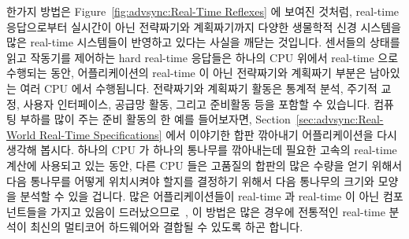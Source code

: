 한가지 방법은
Figure~\ref{fig:advsync:Real-Time Reflexes} 에 보여진 것처럼, real-time 응답으로부터
실시간이 아닌 전략짜기와 계획짜기까지 다양한 생물학적 신경 시스템을 많은
real-time 시스템들이 반영하고 있다는 사실을 깨닫는 것입니다.
센서들의 상태를 읽고 작동기를 제어하는 hard real-time 응답들은 하나의 CPU
위에서 real-time 으로 수행되는 동안, 어플리케이션의 real-time 이 아닌
전략짜기와 계획짜기 부분은 남아있는 여러 CPU 에서 수행됩니다.
전략짜기와 계획짜기 활동은 통계적 분석, 주기적 교정, 사용자 인터페이스, 공급망
활동, 그리고 준비활동 등을 포함할 수 있습니다.
컴퓨팅 부하를 많이 주는 준비 활동의 한 예를 들어보자면,
Section~\ref{sec:advsync:Real-World Real-Time Specifications} 에서 이야기한 합판
깎아내기 어플리케이션을 다시 생각해 봅시다.
하나의 CPU 가 하나의 통나무를 깎아내는데 필요한 고속의 real-time 계산에
사용되고 있는 동안, 다른 CPU 들은 고품질의 합판의 많은 수량을 얻기 위해서 다음
통나무를 어떻게 위치시켜야 할지를 결정하기 위해서 다음 통나무의 크기와 모양을
분석할 수 있을 겁니다.
많은 어플리케이션들이 real-time 과 real-time 이 아닌 컴포넌트들을 가지고 있음이
드러났으므로~\cite{RobertBerry2008IBMSysJ}, 이 방법은 많은 경우에 전통적인
real-time 분석이 최신의 멀티코어 하드웨어와 결합될 수 있도록 하곤 합니다.

